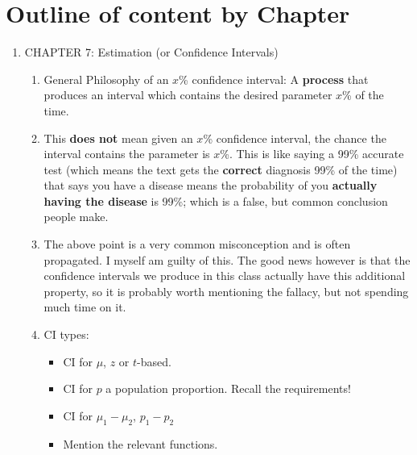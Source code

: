 \documentclass{article}
\begin{document}
\section*{Outline of content by Chapter}

\begin{enumerate}    
    \item CHAPTER 7: Estimation (or Confidence Intervals)
    
        \begin{enumerate}
        
            \item General Philosophy of an $x$\% confidence interval: A \textbf{process} that produces an interval which contains the desired parameter $x$\% of the time.
            
            \item This \textbf{does not} mean given an $x$\% confidence interval, the chance the interval contains the parameter is $x$\%. This is like saying a 99\% accurate test (which means the text gets the \textbf{correct} diagnosis 99\% of the time) that says you have a disease means the probability of you \textbf{actually having the disease} is 99\%; which is a false, but common conclusion people make.
            
            \item The above point is a very common misconception and is often propagated. I myself am guilty of this. The good news however is that the confidence intervals we produce in this class actually have this additional property, so it is probably worth mentioning the fallacy, but not spending much time on it.
            
            \item CI types:
            
                \begin{itemize}
                
                    \item CI for $\mu$, $z$ or $t$-based.
                    
                    \item CI for $p$ a population proportion. Recall the requirements!
                    
                    \item CI for $\mu_1 - \mu_2$, $p_1-p_2$
                    
                    \item Mention the relevant functions.
                    

\end{itemize}
\end{enumerate}
\end{enumerate}
\end{document}
